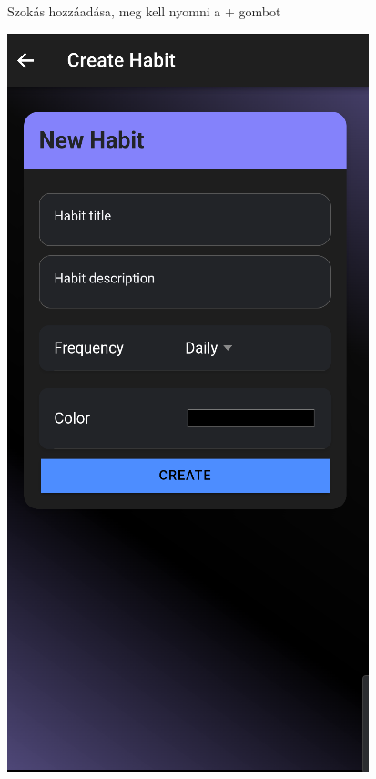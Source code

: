 \documentclass[12pt]{report}
\begin{document}
\begin{figure}[H]
\begin{minipage}[b]{0.25\textwidth}
       Szokás hozzáadása, meg kell nyomni a + gombot
    \end{minipage}
    \hfill
    \begin{minipage}[b]{0.25\textwidth}
        \centering
        \includegraphics[width=\linewidth]{src/habit2.png}

\end{minipage}
\end{figure}
\end{document}
